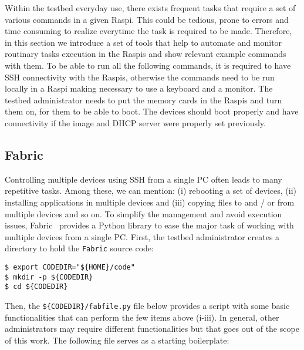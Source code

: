 
\label{sec:tools}
Within the testbed everyday use, there exists frequent tasks that require
a set of various commands in a given \ac{Raspi}. This could be tedious, prone
to errors and time consuming to realize everytime the task is required to be
made. Therefore, in this section we introduce a set of tools that help to
automate and monitor routinary tasks execution in the \ac{Raspi}s and show
relevant example commands with them. To be able to run all the following
commands, it is required to have \ac{SSH} connectivity with the \ac{Raspi}s,
otherwise the commands need to be run locally in a \ac{Raspi} making
necessary to use a keyboard and a monitor. The testbed
administrator needs to put the memory cards in the \ac{Raspi}s and turn them
on, for them to be able to boot. The devices should boot properly and have
connectivity if the image and \ac{DHCP} server were properly set previously.


\subsection{Fabric}
Controlling multiple devices using \ac{SSH} from a single \ac{PC}
often leads to many repetitive tasks. Among these, we can mention:
(i) rebooting a set of devices, (ii) installing applications in multiple
devices and (iii) copying files to and / or from multiple devices and so on. To
simplify the management and avoid execution issues, Fabric~\cite{python_fabric} provides
a Python library to ease the major task of working with multiple devices from
a single \ac{PC}. First, the testbed administrator creates a directory to
hold the \texttt{Fabric} source code:

\begin{lstlisting}[]
$ export CODEDIR="${HOME}/code"
$ mkdir -p ${CODEDIR}
$ cd ${CODEDIR}
\end{lstlisting}
\FloatBarrier
\vspace{-5mm}

Then, the \texttt{\$\{CODEDIR\}/fabfile.py} file below provides a script with
some basic functionalities that can perform the few items above (i-iii).
In general, other administrators may require different functionalities
but that goes out of the scope of this work. The following
file serves as a starting boilerplate:

